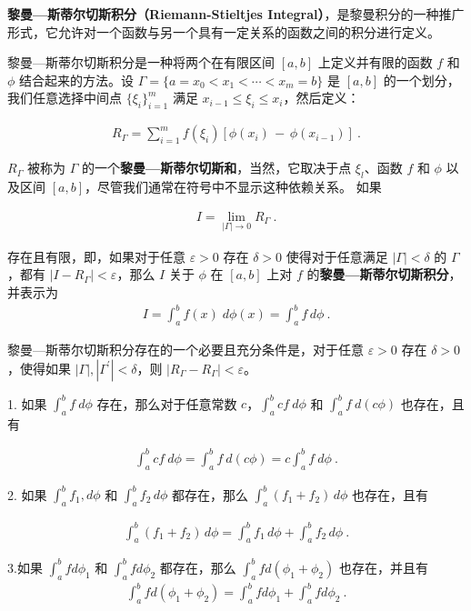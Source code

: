 
\textbf{黎曼—斯蒂尔切斯积分（Riemann-Stieltjes Integral）}，是黎曼积分的一种推广形式，它允许对一个函数与另一个具有一定关系的函数之间的积分进行定义。

黎曼—斯蒂尔切斯积分是一种将两个在有限区间 $ [a, b] $ 上定义并有限的函数 $ f $ 和 $ \phi $ 结合起来的方法。设 $ \Gamma=\{a=x_{0}<x_{1}<\cdots<x_{m}=b\} $ 是 $ [a, b] $ 的一个划分，我们任意选择中间点 $ \{\xi_{i}\}_{i=1}^{m} $ 满足 $ x_{i-1}\leq\xi_{i}\leq x_{i} $，然后定义：

\begin{align}
R_{\Gamma}=\sum_{i=1}^{m}f(\xi_{i})[\phi(x_{i})\,-\,\phi(x_{i-1})]~.
\end{align}

$ R_{\Gamma} $ 被称为 $ \Gamma $ 的一个\textbf{黎曼—斯蒂尔切斯和}，当然，它取决于点 $ \xi_{l} $、函数 $ f $ 和 $ \phi $ 以及区间 $ [a, b] $，尽管我们通常在符号中不显示这种依赖关系。
如果

\begin{align}
I=\lim_{|\Gamma|\to0}R_{\Gamma}~.
\end{align}

存在且有限，即，如果对于任意 $ \varepsilon>0 $ 存在 $ \delta>0 $ 使得对于任意满足 $ |\Gamma|<\delta $ 的 $ \Gamma $，都有 $ |I-R_{\Gamma}|<\varepsilon $，那么 $ I $ 关于 $ \phi $ 在 $ [a, b] $ 上对 $ f $ 的\textbf{黎曼—斯蒂尔切斯积分}，并表示为
\begin{align}
I=\int_{a}^{b}\!f(x)\;d\phi(x)=\int_{a}^{b}\!f\,d\phi~.
\end{align}

黎曼—斯蒂尔切斯积分存在的一个必要且充分条件是，对于任意 $ \varepsilon>0 $ 存在 $ \delta>0 $，使得如果 $ |\Gamma|,|\Gamma^{\prime}|<\delta $，则 $ |R_{\Gamma}-R_{\Gamma}|<\varepsilon $。

\begin{theorem}{}
1. 如果 $\int_{a}^{b}f\ d\phi$ 存在，那么对于任意常数 $c$，$\int_{a}^{b}cf\ d\phi$ 和 $\int_{a}^{b}f\ d(c\phi)$ 也存在，且有

\begin{align} \int_{a}^{b}cf\ d\phi=\int_{a}^{b}f\ d(c\phi)=c\int_{a}^{b}f\ d\phi~. \end{align}

2.
如果 $\int_{a}^{b}f_{1},d\phi$ 和 $\int_{a}^{b}f_{2}\,d\phi$ 都存在，那么 $\int_{a}^{b}(f_{1}+f_{2})\,d\phi$ 也存在，且有

\begin{align} \int_{a}^{b}(f_{1}+f_{2})\,d\phi=\int_{a}^{b}f_{1}\,d\phi+\int_{a}^{b}f_{2}\,d\phi~. \end{align}

3.如果 $ \int_{a}^{b}fd\phi_{1} $ 和 $ \int_{a}^{b}fd\phi_{2} $ 都存在，那么 $ \int_{a}^{b}fd(\phi_{1}+\phi_{2}) $ 也存在，并且有 \begin{align} \int_{a}^{b}fd(\phi_{1}+\phi_{2})=\int_{a}^{b}fd\phi_{1}+\int_{a}^{b}fd\phi_{2}~. \end{align}
\end{theorem}

